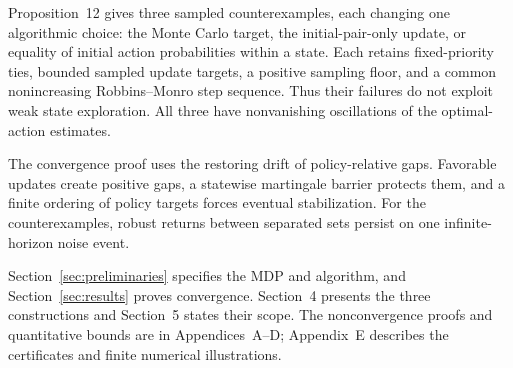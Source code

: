 Proposition~12 gives three sampled counterexamples, each changing one algorithmic
choice: the Monte Carlo target, the initial-pair-only update, or equality of initial action
probabilities within a state. Each retains fixed-priority ties, bounded sampled update targets,
a positive sampling floor, and a common nonincreasing Robbins--Monro step sequence. Thus
their failures do not exploit weak state exploration. All three have nonvanishing oscillations
of the optimal-action estimates.

The convergence proof uses the restoring drift of policy-relative gaps. Favorable updates
create positive gaps, a statewise martingale barrier protects them, and a finite ordering of
policy targets forces eventual stabilization. For the counterexamples, robust returns between
separated sets persist on one infinite-horizon noise event.

Section~\ref{sec:preliminaries} specifies the MDP and algorithm, and Section~\ref{sec:results} proves convergence. Section~4
presents the three constructions and Section~5 states their scope. The nonconvergence proofs
and quantitative bounds are in Appendices~A--D; Appendix~E describes the certificates and
finite numerical illustrations.

